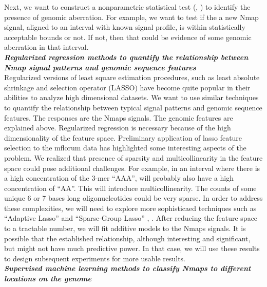 \documentclass[12pt]{extarticle} %
\begin{document}
Next, we want to construct a nonparametric statistical test (\cite{Wang_etal_1997_AOS}, \cite{Hall_etal_2007_StatSinica}) to identify the presence of genomic aberration. For example, we want to test if the a new Nmap signal, aligned to an interval with known signal profile, is within statistically acceptable bounds or not. If not, then that could be evidence of some genomic aberration in that interval.\\
\noindent
{\emph{\bf{Regularized regression methods to quantify the relationship between Nmap signal patterns and genomic sequence features}}}\\
Regularized versions of least square estimation procedures, such as least absolute shrinkage and selection operator \cite{Tibshirani_1996_JRSSB} (LASSO) have become quite popular in their abilities to analyze high dimensional datasets. We want to use similar techniques to quantify the relationship between typical signal patterns and genomic sequence features. The responses are the Nmaps signals. The genomic features are explained above. Regularized regression is necessary because of the high dimensionality of the feature space. Preliminary application of lasso feature selection to the mflorum data has highlighted some interesting aspects of the problem. We realized that presence of sparsity and multicollinearity in the feature space could pose additional challenges. For example, in an interval where there is a high concentration of the 3-mer ``AAA'', will probably also have a high concentration of ``AA''. This will introduce multicollinearity. The counts of some unique 6 or 7 bases long oligonucleotides could be very sparse. In order to address these complexities, we will need to explore more sophisticaed techniques such as ``Adaptive Lasso'' and ``Sparse-Group Lasso'' \cite{Wang_etal_1997_AOS}, \cite{Simon_etal_2013_JCGS}. After reducing the feature space to a tractable number, we will fit additive models to the Nmaps signals. It is possible that the established relationship, although interesting and significant, but might not have much predictive power. In that case, we will use these results to design subsequent experiments for more usable results.\\
\noindent
{\emph{\bf{Supervised machine learning methods to classify Nmaps to different locations on the genome}}}\\
\end{document}

